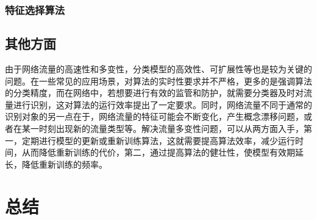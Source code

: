 \documentclass[a4papper]{article}
\begin{document}
\subsubsection{特征选择算法}
\subsection{其他方面}
\par\setlength{\parindent}{2em} %
由于网络流量的高速性和多变性，分类模型的高效性、可扩展性等也是较为关键的问题。在一些常见的应用场景，对算法的实时性要求并不严格，更多的是强调算法的分类精度，而在网络中，若想要进行有效的监管和防护，就需要分类器及时对流量进行识别，这对算法的运行效率提出了一定要求。同时，网络流量不同于通常的识别对象的另一点在于，网络流量的特征可能会不断变化，产生概念漂移问题，或者在某一时刻出现新的流量类型等。解决流量多变性问题，可以从两方面入手，第一，定期进行模型的更新或重新训练算法，这就需要提高算法效率，减少运行时间，从而降低重新训练的代价，第二，通过提高算法的健壮性，使模型有效期延长，降低重新训练的频率。

\section{总结}



\end{document}
